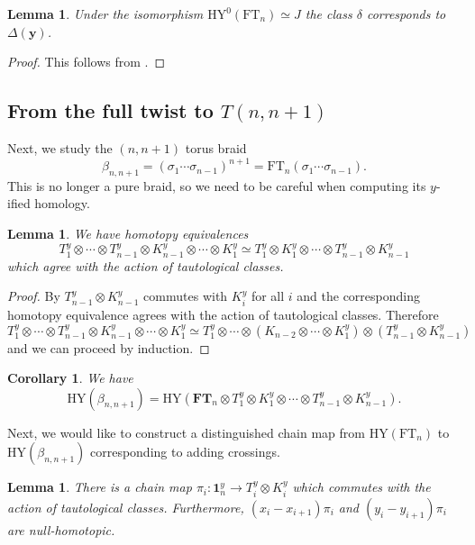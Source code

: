 \documentclass{amsart}
\newcommand{\yy}{\mathbf{y}}
\newcommand{\FT}{\mathrm{FT}}
\newcommand{\HY}{\mathrm{HY}}
\newcommand{\one}{\mathbf{1}}
\newcommand{\bFT}{\mathbf{FT}}
\numberwithin{equation}{section}
\newtheorem{corollary}[theorem]{Corollary}
\newtheorem{lemma}[theorem]{Lemma}
\theoremstyle{definition}
\begin{document}
\begin{lemma}
\label{lem: delta}
Under the isomorphism $\HY^0(\FT_n)\simeq J$ the class $\delta$ corresponds to $\Delta(\yy)$.  
\end{lemma}

\begin{proof}
This follows from \cite[Lemma 5.9]{BGHW}.
\end{proof}

\subsection{From the full twist to $T(n,n+1)$}

Next, we study the $(n,n+1)$ torus braid 
$$
\beta_{n,n+1}=(\sigma_1\cdots\sigma_{n-1})^{n+1}=\FT_n(\sigma_1\cdots\sigma_{n-1}).
$$
This is no longer a pure braid, so we need to be careful when computing its $y$-ified homology.

\begin{lemma}
We have homotopy equivalences
$$
T_1^y\otimes \cdots\otimes  T_{n-1}^y\otimes K_{n-1}^y\otimes \cdots \otimes K_1^y\simeq T_1^y\otimes K_1^y\otimes \cdots \otimes T_{n-1}^y\otimes K_{n-1}^y
$$
which agree with the action of tautological classes.
\end{lemma}

\begin{proof}
By \cite[Proposition 4.11]{GHM} $T_{n-1}^y\otimes K_{n-1}^y$ commutes with $K_i^y$ for all $i$ and the corresponding homotopy equivalence agrees with the action of tautological classes. Therefore
$$
T_1^y\otimes \cdots\otimes  T_{n-1}^y\otimes K_{n-1}^y\otimes \cdots \otimes K_1^y\simeq 
T_1^y\otimes \cdots\otimes  (K_{n-2}\otimes \cdots \otimes K_1^y)\otimes (T_{n-1}^y\otimes K_{n-1}^y)
$$
and we can proceed by induction.
\end{proof}

\begin{corollary}
\label{cor: HY n n+1}
We have 
$$
\HY(\beta_{n,n+1})=\HY(\bFT_n\otimes T_1^y\otimes K_1^y\otimes \cdots \otimes T_{n-1}^y\otimes K_{n-1}^y).
$$
\end{corollary}

Next, we would like to construct a distinguished chain map from $\HY(\FT_n)$ to $\HY(\beta_{n,n+1})$ corresponding to adding crossings. 

\begin{lemma}
\label{lem: pi i}
There is a chain map $\pi_i:\one_n^y\to T_i^y\otimes K_i^y$ which  commutes with the action of tautological classes. Furthermore, $(x_i-x_{i+1})\pi_i$ and $(y_i-y_{i+1})\pi_i$ are null-homotopic. 
\end{lemma}
\end{document}
